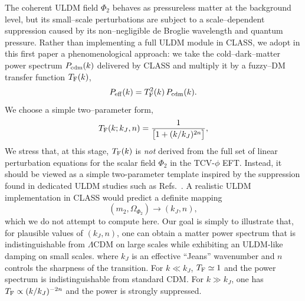 \documentclass[aps,prd,onecolumn,nofootinbib,superscriptaddress]{revtex4-2}
\begin{document}
The coherent ULDM field $\Phi_2$ behaves as pressureless matter at the background level, but its small--scale perturbations are subject to a scale--dependent suppression caused by its non--negligible de Broglie wavelength and quantum pressure.
Rather than implementing a full ULDM module in CLASS, we adopt in this first paper a phenomenological approach: we take the cold--dark--matter power spectrum $P_{\rm cdm}(k)$ delivered by CLASS and multiply it by a fuzzy--DM transfer function $T_{\rm F}(k)$,
\begin{equation}
  P_{\rm eff}(k) = T_{\rm F}^2(k)\,P_{\rm cdm}(k).
\end{equation}
We choose a simple two--parameter form,
\begin{equation}
  T_{\rm F}(k;k_J,n)
  = \frac{1}{\bigl[1+(k/k_J)^{2n}\bigr]},
  \label{eq:Tf-def}
\end{equation}
We stress that, at this stage, $T_{\rm F}(k)$ is \emph{not} derived from the full set of linear perturbation equations for the scalar field $\Phi_2$ in the TCV-$\phi$ EFT. Instead, it should be viewed as a simple two-parameter template inspired by the suppression found in dedicated ULDM studies such as Refs.~\cite{ULDM,Hui2017}. A realistic ULDM implementation in CLASS would predict a definite mapping
\begin{equation}
  (m_2,\Omega_{\Phi_2}) \longrightarrow (k_J,n),
\end{equation}
which we do not attempt to compute here. Our goal is simply to illustrate that, for plausible values of $(k_J,n)$, one can obtain a matter power spectrum that is indistinguishable from $\Lambda$CDM on large scales while exhibiting an ULDM-like damping on small scales.
where $k_J$ is an effective ``Jeans'' wavenumber and $n$ controls the sharpness of the transition.
For $k\ll k_J$, $T_{\rm F}\simeq 1$ and the power spectrum is indistinguishable from standard CDM.
For $k\gg k_J$, one has $T_{\rm F}\propto (k/k_J)^{-2n}$ and the power is strongly suppressed.
\end{document}
